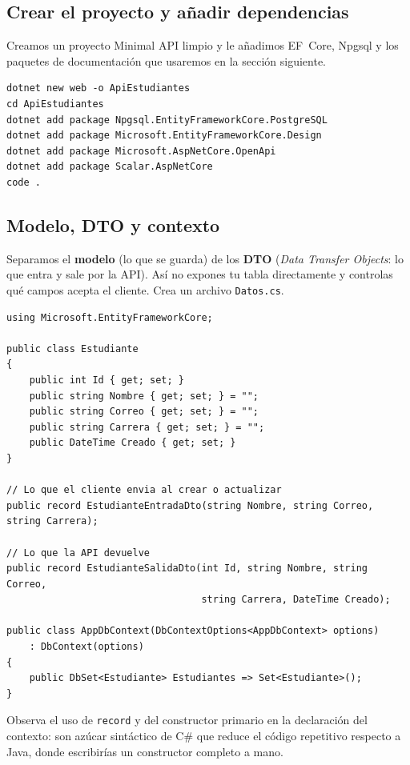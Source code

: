 \documentclass[11pt]{article}
\begin{document}
\subsection{Crear el proyecto y añadir dependencias}
Creamos un proyecto Minimal API limpio y le añadimos EF~Core, Npgsql y los paquetes de documentación que usaremos en la sección siguiente.

\begin{cajacodigo}
\begin{lstlisting}[style=shell]
dotnet new web -o ApiEstudiantes
cd ApiEstudiantes
dotnet add package Npgsql.EntityFrameworkCore.PostgreSQL
dotnet add package Microsoft.EntityFrameworkCore.Design
dotnet add package Microsoft.AspNetCore.OpenApi
dotnet add package Scalar.AspNetCore
code .
\end{lstlisting}
\end{cajacodigo}

\subsection{Modelo, DTO y contexto}
Separamos el \textbf{modelo} (lo que se guarda) de los \textbf{DTO} (\emph{Data Transfer Objects}: lo que entra y sale por la API). Así no expones tu tabla directamente y controlas qué campos acepta el cliente. Crea un archivo \texttt{Datos.cs}.

\begin{cajacodigo}
\begin{lstlisting}[style=cs]
using Microsoft.EntityFrameworkCore;

public class Estudiante
{
    public int Id { get; set; }
    public string Nombre { get; set; } = "";
    public string Correo { get; set; } = "";
    public string Carrera { get; set; } = "";
    public DateTime Creado { get; set; }
}

// Lo que el cliente envia al crear o actualizar
public record EstudianteEntradaDto(string Nombre, string Correo, string Carrera);

// Lo que la API devuelve
public record EstudianteSalidaDto(int Id, string Nombre, string Correo,
                                  string Carrera, DateTime Creado);

public class AppDbContext(DbContextOptions<AppDbContext> options)
    : DbContext(options)
{
    public DbSet<Estudiante> Estudiantes => Set<Estudiante>();
}
\end{lstlisting}
\end{cajacodigo}
\vspace{2pt}
Observa el uso de \texttt{record} y del constructor primario en la declaración del contexto: son azúcar sintáctico de C\# que reduce el código repetitivo respecto a Java, donde escribirías un constructor completo a mano.
\end{document}
